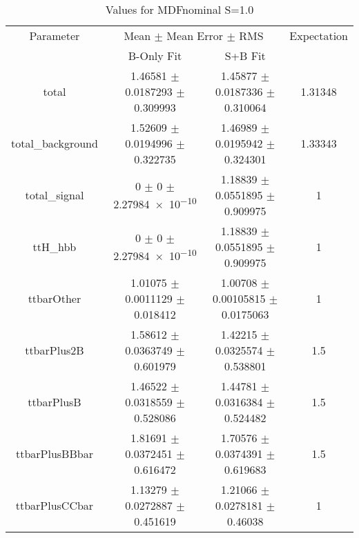 \begin{table}
\centering
\caption{Values for MDFnominal S=1.0}
\begin{tabular}{cccc}
\toprule
Parameter & \multicolumn{2}{c}{Mean $\pm$ Mean Error $\pm$ RMS} & Expectation\\
 & B-Only Fit & S+B Fit & \\
\midrule
total & \num{1.46581} $\pm$ \num{0.0187293} $\pm$ \num{0.309993} & \num{1.45877} $\pm$ \num{0.0187336} $\pm$ \num{0.310064} & \num{1.31348}\\
total\_background & \num{1.52609} $\pm$ \num{0.0194996} $\pm$ \num{0.322735} & \num{1.46989} $\pm$ \num{0.0195942} $\pm$ \num{0.324301} & \num{1.33343}\\
total\_signal & \num{0} $\pm$ \num{0} $\pm$ \num{2.27984e-10} & \num{1.18839} $\pm$ \num{0.0551895} $\pm$ \num{0.909975} & \num{1}\\
ttH\_hbb & \num{0} $\pm$ \num{0} $\pm$ \num{2.27984e-10} & \num{1.18839} $\pm$ \num{0.0551895} $\pm$ \num{0.909975} & \num{1}\\
ttbarOther & \num{1.01075} $\pm$ \num{0.0011129} $\pm$ \num{0.018412} & \num{1.00708} $\pm$ \num{0.00105815} $\pm$ \num{0.0175063} & \num{1}\\
ttbarPlus2B & \num{1.58612} $\pm$ \num{0.0363749} $\pm$ \num{0.601979} & \num{1.42215} $\pm$ \num{0.0325574} $\pm$ \num{0.538801} & \num{1.5}\\
ttbarPlusB & \num{1.46522} $\pm$ \num{0.0318559} $\pm$ \num{0.528086} & \num{1.44781} $\pm$ \num{0.0316384} $\pm$ \num{0.524482} & \num{1.5}\\
ttbarPlusBBbar & \num{1.81691} $\pm$ \num{0.0372451} $\pm$ \num{0.616472} & \num{1.70576} $\pm$ \num{0.0374391} $\pm$ \num{0.619683} & \num{1.5}\\
ttbarPlusCCbar & \num{1.13279} $\pm$ \num{0.0272887} $\pm$ \num{0.451619} & \num{1.21066} $\pm$ \num{0.0278181} $\pm$ \num{0.46038} & \num{1}\\
\bottomrule
\end{tabular}
\end{table}